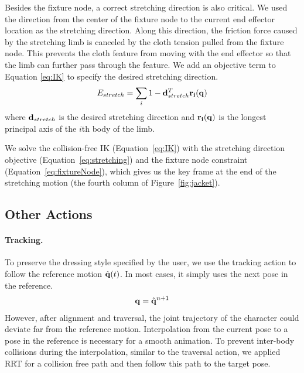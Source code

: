 Besides the fixture node, a correct stretching direction is also critical. We used the direction from the center of the fixture node to the current end effector location as the stretching direction. Along this direction, the friction force caused by the stretching limb is canceled by the cloth tension pulled from the fixture node. This prevents the cloth feature from moving with the end effector so that the limb can further pass through the feature. We add an objective term to Equation \ref{eq:IK} to specify the desired stretching direction.
\begin{equation}
  E_{stretch} = \sum_i1 - \mathbf{d}_{stretch}^T\mathbf{r_i(q)}
  \label{eq:stretching}
\end{equation}
where $\mathbf{d}_{stretch}$ is the desired stretching direction and $\mathbf{r_i(q)}$ is the longest principal axis of the $i$th body of the limb.

We solve the collision-free IK (Equation~\ref{eq:IK}) with the stretching direction objective (Equation~\ref{eq:stretching}) and the fixture node constraint (Equation~\ref{eq:fixtureNode}), which gives us the key frame at the end of the stretching motion (the fourth column of Figure~\ref{fig:jacket}).

\subsection{Other Actions}

\paragraph{Tracking.} To preserve the dressing style specified by the user, we use the tracking action to follow the reference motion $\hat{\mathbf{q}}(t)$. In most cases, it simply uses the next pose in the reference.
\begin{displaymath}
\mathbf{q} = \hat{\mathbf{q}}^{n+1}
\end{displaymath}
However, after alignment and traversal, the joint trajectory of the character could deviate far from the reference motion. Interpolation from the current pose to a pose in the reference is necessary for a smooth animation. To prevent inter-body collisions during the interpolation, similar to the traversal action, we applied RRT for a collision free path and then follow this path to the target pose.


